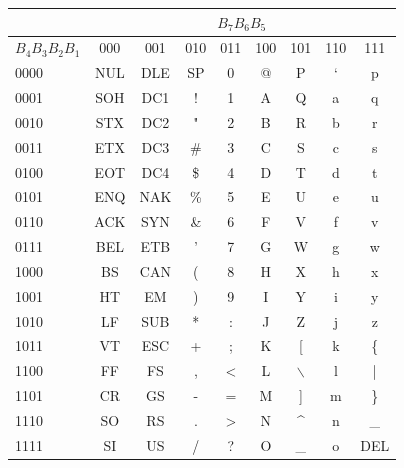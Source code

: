 \documentclass{templateNote}
\begin{document}
\begin{table}[H]
    \centering
    \begin{tabular}{|l|c|c|c|c|c|c|c|c|}
        \hline  
        & \multicolumn{8}{|c|}{$B_7B_6B_5$} \\ %
        \hline
        $B_4B_3B_2B_1$ & 000 & 001 & 010 & 011 & 100 & 101 & 110 & 111 \\
        \hline
        0000 & NUL & DLE & SP & 0 & @ & P & ` & p \\
        0001 & SOH & DC1 & ! & 1 & A & Q & a & q \\
        0010 & STX & DC2 & " & 2 & B & R & b & r \\
        0011 & ETX & DC3 & \# & 3 & C & S & c & s \\
        0100 & EOT & DC4 & \$ & 4 & D & T & d & t \\
        0101 & ENQ & NAK & \% & 5 & E & U & e & u \\
        0110 & ACK & SYN & \& & 6 & F & V & f & v \\
        0111 & BEL & ETB & ' & 7 & G & W & g & w \\
        1000 & BS & CAN & ( & 8 & H & X & h & x \\
        1001 & HT & EM & ) & 9 & I & Y & i & y \\
        1010 & LF & SUB & * & : & J & Z & j & z \\
        1011 & VT & ESC & + & ; & K & [ & k & \{ \\
        1100 & FF & FS & , & < & L & $\backslash$ & l & | \\
        1101 & CR & GS & - & = & M & ] & m & \} \\
        1110 & SO & RS & . & > & N & \^{} & n & \_ \\
        1111 & SI & US & / & ? & O & \_ & o & DEL \\
        \hline
    \end{tabular}   
\end{table}
\end{document}
